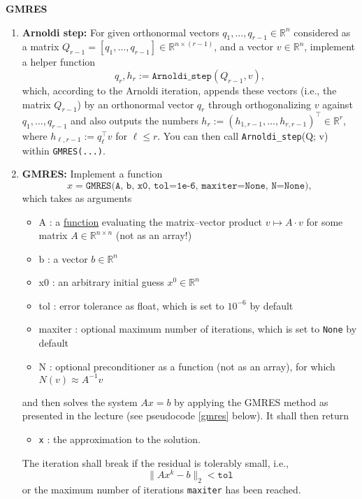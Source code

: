 \textbf{GMRES}
\begin{enumerate}
		\item \textbf{Arnoldi step:} For given orthonormal vectors $q_1,\ldots, q_{r-1} \in \mathbb{R}^n$ considered as a matrix $Q_{r-1}=[q_1,\ldots,q_{r-1}]\in\mathbb{R}^{n\times (r-1)}$, and a vector $v\in\mathbb{R}^n$, implement a helper function
	$$q_r, h_r := \texttt{Arnoldi\_step}(Q_{r-1}, v),$$
	which, according to the Arnoldi iteration, appends these vectors (i.e., the matrix $Q_{r-1}$) by an orthonormal vector $q_r$ through orthogonalizing $v$ against $q_1,\ldots, q_{r-1}$ and also outputs the numbers $h_r := (h_{1,r-1},\ldots, h_{r,r-1})^\top \in \mathbb{R}^{r}$, where $h_{\ell, r-1} :=  q_\ell^\top v$ for $\ell \leq r$. You can then call \texttt{Arnoldi\_step}(Q; v) within \texttt{GMRES(...)}.
	\item \textbf{GMRES:}
Implement a function $$x = \texttt{GMRES(A, b, x0, tol=1e-6, maxiter=None, N=None)},$$
which takes as arguments
\begin{itemize}
	\item A : a \underline{function} evaluating the matrix--vector product $v\mapsto A\cdot v$ for some matrix $ A \in \mathbb{R}^{n \times n}$ (not as an array!)
	\item b : a vector $b \in \mathbb{R}^ {n}$
	\item x0 : an arbitrary initial guess $x^0 \in \mathbb{R}^ {n}$
	\item tol : error tolerance as float, which is set to $10^{-6}$ by default 
	\item maxiter : optional maximum number of iterations, which is set to \texttt{None} by default
	\item N : optional preconditioner as a function (not as an array), for which $N(v)\approx A^{-1}v$
\end{itemize}
and then solves the system $Ax=b$ by applying the GMRES method as presented in the lecture (see pseudocode \ref{gmres} below). It shall then return
\begin{itemize}
	\item \texttt{x} : the approximation to the solution.
\end{itemize}	
The iteration shall break if the residual is tolerably small, i.e., 
$$\|Ax^k-b\|_2 < \texttt{tol}$$
or the maximum number of iterations \texttt{maxiter} has been reached.



\end{enumerate}
